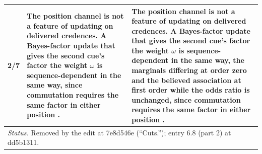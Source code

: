 \documentclass[10pt]{article}
\theoremstyle{definition}
\newlength{\fullw}\setlength{\fullw}{25.9cm}
\begin{document}
{\begin{longtable}{|p{0.9cm}|p{12.2cm}|p{12.2cm}|}
2/7 & The position channel is not a feature of updating on delivered credences. A Bayes-factor update that gives the second cue's factor the weight $\omega$ is sequence-dependent in the same way, since commutation requires the same factor in either position \citep{Wagner2002}. & The position channel is not a feature of updating on delivered credences. A Bayes-factor update that gives the second cue's factor the weight $\omega$ is sequence-dependent in the same way, the marginals differing at order zero and the believed association at first order while the odds ratio is unchanged, since commutation requires the same factor in either position \citep{Wagner2002}. \\ \hline
\multicolumn{3}{|p{\fullw}|}{\textit{Status.} Removed by the edit at 7e8d546e (``Cuts.''); entry 6.8 (part 2) at dd5b1311.} \\ \hline

\end{longtable}}
\end{document}
